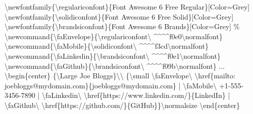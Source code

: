 \documentclass[
  british,
  a4paper,
  rgb,
  dvipsnames,
  svgnames,
  hyphens]{article}
\newenvironment{Shaded}{\begin{snugshade}}{\end{snugshade}}
\newcommand{\CommentTok}[1]{\textcolor[rgb]{0.50,0.62,0.50}{#1}}
\newcommand{\ExtensionTok}[1]{\textcolor[rgb]{0.80,0.80,0.80}{#1}}
\newcommand{\FunctionTok}[1]{\textcolor[rgb]{0.94,0.94,0.56}{#1}}
\newcommand{\KeywordTok}[1]{\textcolor[rgb]{0.94,0.87,0.69}{#1}}
\newcommand{\NormalTok}[1]{\textcolor[rgb]{0.80,0.80,0.80}{#1}}
\begin{document}
\begin{Shaded}
\begin{Highlighting}[]
\FunctionTok{\textbackslash{}newfontfamily}\NormalTok{\{}\FunctionTok{\textbackslash{}regulariconfont}\NormalTok{\}\{Font Awesome 6 Free Regular\}[Color=Grey]}
\FunctionTok{\textbackslash{}newfontfamily}\NormalTok{\{}\FunctionTok{\textbackslash{}solidiconfont}\NormalTok{\}\{Font Awesome 6 Free Solid\}[Color=Grey]}
\FunctionTok{\textbackslash{}newfontfamily}\NormalTok{\{}\FunctionTok{\textbackslash{}brandsiconfont}\NormalTok{\}\{Font Awesome 6 Brands\}[Color=Grey]}
\CommentTok{\%}
\FunctionTok{\textbackslash{}newcommand}\NormalTok{\{}\ExtensionTok{\textbackslash{}faEnvelope}\NormalTok{\}\{}\FunctionTok{\textbackslash{}regulariconfont\textbackslash{} }\NormalTok{\^{}\^{}\^{}\^{}f0e0}\FunctionTok{\textbackslash{}normalfont}\NormalTok{\}}
\FunctionTok{\textbackslash{}newcommand}\NormalTok{\{}\ExtensionTok{\textbackslash{}faMobile}\NormalTok{\}\{}\FunctionTok{\textbackslash{}solidiconfont\textbackslash{} }\NormalTok{\^{}\^{}\^{}\^{}f3cd}\FunctionTok{\textbackslash{}normalfont}\NormalTok{\}}
\FunctionTok{\textbackslash{}newcommand}\NormalTok{\{}\ExtensionTok{\textbackslash{}faLinkedin}\NormalTok{\}\{}\FunctionTok{\textbackslash{}brandsiconfont\textbackslash{} }\NormalTok{\^{}\^{}\^{}\^{}f0e1}\FunctionTok{\textbackslash{}normalfont}\NormalTok{\}}
\FunctionTok{\textbackslash{}newcommand}\NormalTok{\{}\ExtensionTok{\textbackslash{}faGithub}\NormalTok{\}\{}\FunctionTok{\textbackslash{}brandsiconfont\textbackslash{} }\NormalTok{\^{}\^{}\^{}\^{}f09b}\FunctionTok{\textbackslash{}normalfont}\NormalTok{\}}
\NormalTok{...}
\KeywordTok{\textbackslash{}begin}\NormalTok{\{}\ExtensionTok{center}\NormalTok{\}}
\NormalTok{\{}\FunctionTok{\textbackslash{}Large}\NormalTok{ Joe Bloggs\}}\FunctionTok{\textbackslash{}\textbackslash{}}
\NormalTok{\{}\FunctionTok{\textbackslash{}small} \FunctionTok{\textbackslash{}faEnvelope\textbackslash{}}
\FunctionTok{\textbackslash{}href}\NormalTok{\{mailto: joebloggs@mydomain.com\}\{joebloggs@mydomain.com\} |}
\FunctionTok{\textbackslash{}faMobile\textbackslash{} }\NormalTok{+1{-}555{-}3456{-}7890 |}
\FunctionTok{\textbackslash{}faLinkedin\textbackslash{} \textbackslash{}href}\NormalTok{\{https://www.linkedin.com/\}\{LinkedIn\} |}
\FunctionTok{\textbackslash{}faGithub\textbackslash{} \textbackslash{}href}\NormalTok{\{https://github.com/\}\{GitHub\}\}}\FunctionTok{\textbackslash{}normalsize}
\KeywordTok{\textbackslash{}end}\NormalTok{\{}\ExtensionTok{center}\NormalTok{\}}
\end{Highlighting}
\end{Shaded}
\end{document}

